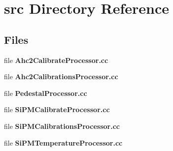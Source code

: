 \section{src Directory Reference}
\label{dir_f7464cf5314627200818c11a40995d61}
\subsection*{Files}
\begin{DoxyCompactItemize}
\item 
file {\bfseries Ahc2\-Calibrate\-Processor.\-cc}
\item 
file {\bfseries Ahc2\-Calibrations\-Processor.\-cc}
\item 
file {\bfseries Pedestal\-Processor.\-cc}
\item 
file {\bfseries Si\-P\-M\-Calibrate\-Processor.\-cc}
\item 
file {\bfseries Si\-P\-M\-Calibrations\-Processor.\-cc}
\item 
file {\bfseries Si\-P\-M\-Temperature\-Processor.\-cc}
\end{DoxyCompactItemize}
